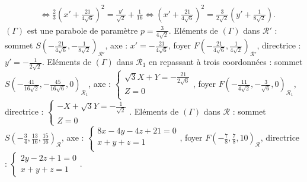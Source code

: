{{\begin{align*}
 &\Leftrightarrow\frac{2}{3}\left(x'+\frac{21}{4\sqrt{6}}\right)^2=\frac{y'}{\sqrt{2}}+\frac{1}{16}\Leftrightarrow\left(x'+\frac{21}{4\sqrt{6}}\right)^2=\frac{3}{2\sqrt{2}}\left(y'+\frac{1}{8\sqrt{2}}\right).
\end{align*}
$\left(\Gamma\right)$ est une parabole de paramètre $p=\frac{3}{4\sqrt{2}}$.
Eléments de $(\Gamma)$ dans $\mathcal{R}'$ : sommet $S\left(-\frac{21}{4\sqrt{6}},-\frac{1}{8\sqrt{2}}\right)_{\mathcal{R}'}$, axe : $x'=-\frac{21}{4\sqrt{6}}$, foyer $F\left(-\frac{21}{4\sqrt{6}},\frac{1}{4\sqrt{2}}\right)_{\mathcal{R}'}$, directrice : $y'=-\frac{1}{2\sqrt{2}}$.
Eléments de $(\Gamma)$ dans $\mathcal{R}_1$ en repassant à trois coordonnées : sommet $S\left(-\frac{41}{16\sqrt{2}},-\frac{45}{16\sqrt{6}},0\right)_{\mathcal{R}_1}$, axe : $\left\{
\begin{array}{l}
\sqrt{3}X+Y=-\frac{21}{2\sqrt{6}}\\
Z=0\\
\end{array}
\right.$, foyer $F\left(-\frac{11}{4\sqrt{2}},-\frac{3}{\sqrt{6}},0\right)_{\mathcal{R}_1}$, directrice : $\left\{
\begin{array}{l}
-X+\sqrt{3}Y=-\frac{1}{\sqrt{2}}\\
Z=0
\end{array}
\right.$.
Eléments de $(\Gamma)$ dans $\mathcal{R}$ : sommet $S\left(-\frac{3}{4},\frac{13}{16},\frac{15}{16}\right)_{\mathcal{R}}$, axe : $\left\{
\begin{array}{l}
8x-4y-4z+21=0\\
x+y+z=1\\
\end{array}
\right.$, foyer $F\left(-\frac{7}{8},\frac{7}{8},10\right)_{\mathcal{R}}$, directrice : $\left\{
\begin{array}{l}
2y-2z+1=0\\
x+y+z=1
\end{array}
\right.$.
}
}
